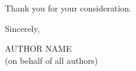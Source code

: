 \documentclass[11pt]{article}
\begin{document}

%
%
%
%


\bigskip
\noindent
Thank you for your consideration.

\bigskip
\noindent
Sincerely,

\bigskip
\noindent
AUTHOR NAME\\
(on behalf of all authors)
\end{document}
